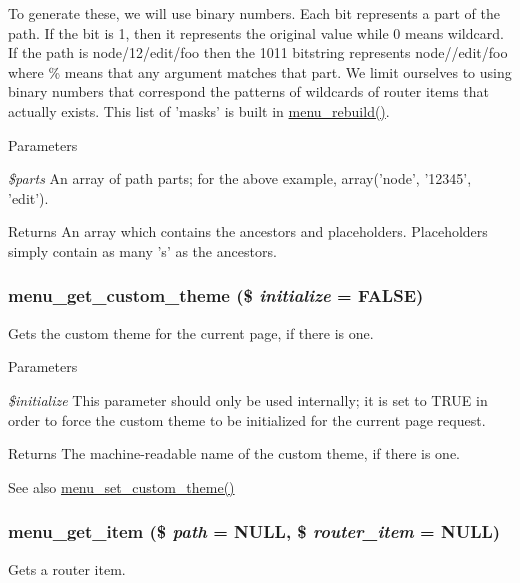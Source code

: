 To generate these, we will use binary numbers. Each bit represents a part of the path. If the bit is 1, then it represents the original value while 0 means wildcard. If the path is node/12/edit/foo then the 1011 bitstring represents node//edit/foo where \% means that any argument matches that part. We limit ourselves to using binary numbers that correspond the patterns of wildcards of router items that actually exists. This list of 'masks' is built in \hyperlink{group__menu_gaf36dcb9d5491ef5e7d2cf22c1f5c69f4}{menu\_\-rebuild()}.


\begin{DoxyParams}{Parameters}
\item[{\em \$parts}]An array of path parts; for the above example, array('node', '12345', 'edit').\end{DoxyParams}
\begin{DoxyReturn}{Returns}
An array which contains the ancestors and placeholders. Placeholders simply contain as many 's' as the ancestors. 
\end{DoxyReturn}
\hypertarget{group__menu_gaf00aa2604e9ad7c0ff0faa6cbc301da8}{
\subsubsection[{menu\_\-get\_\-custom\_\-theme}]{\setlength{\rightskip}{0pt plus 5cm}menu\_\-get\_\-custom\_\-theme (\$ {\em initialize} = {\ttfamily FALSE})}}
\label{group__menu_gaf00aa2604e9ad7c0ff0faa6cbc301da8}
Gets the custom theme for the current page, if there is one.


\begin{DoxyParams}{Parameters}
\item[{\em \$initialize}]This parameter should only be used internally; it is set to TRUE in order to force the custom theme to be initialized for the current page request.\end{DoxyParams}
\begin{DoxyReturn}{Returns}
The machine-\/readable name of the custom theme, if there is one.
\end{DoxyReturn}
\begin{DoxySeeAlso}{See also}
\hyperlink{group__menu_ga2545be84d84b98f84857bea11f7961fb}{menu\_\-set\_\-custom\_\-theme()} 
\end{DoxySeeAlso}
\hypertarget{group__menu_ga855b1ca6ef9e44eb6107a2b9d0f581df}{
\subsubsection[{menu\_\-get\_\-item}]{\setlength{\rightskip}{0pt plus 5cm}menu\_\-get\_\-item (\$ {\em path} = {\ttfamily NULL}, \/  \$ {\em router\_\-item} = {\ttfamily NULL})}}
\label{group__menu_ga855b1ca6ef9e44eb6107a2b9d0f581df}
Gets a router item.


